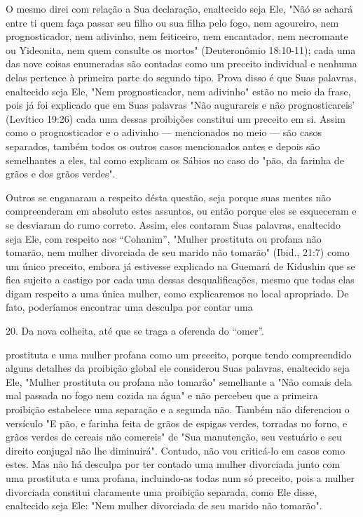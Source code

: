 O mesmo direi com relação a Sua declaração, enaltecido seja Ele, "Nãó se
achará entre ti quem faça passar seu filho ou sua filha pelo fogo, nem
agoureiro, nem prognosticador, nem adivinho, nem feiticeiro, nem
encanta­dor, nem necromante ou Yideonita, nem quem consulte os mortos"
(Deutero­nômio 18:10-11); cada uma das nove coisas enumeradas são
contadas como um preceito individual e nenhuma delas pertence à primeira
parte do segundo ti­po. Prova disso é que Suas palavras, enaltecido seja
Ele, "Nem prognosticador, nem adivinho" estão no meio da frase, pois já
foi explicado que em Suas pala­vras "Não augurareis e não
prognosticareis' (Levítico 19:26) cada uma dessas proibições constitui
um preceito em si. Assim como o prognosticador e o adi­vinho ---
mencionados no meio --- são casos separados, também todos os ou­tros
casos mencionados antes e depois são semelhantes a eles, tal como
expli­cam os Sábios no caso do "pão, da farinha de grãos e dos grãos
verdes".

Outros se enganaram a respeito désta questão, seja porque suas men­tes
não compreenderam em absoluto estes assuntos, ou então porque eles se
esqueceram e se desviaram do rumo correto. Assim, eles contaram Suas
pala­vras, enaltecido seja Ele, com respeito aos ``Cohanim'', "Mulher
prostituta ou profana não tomarão, nem mulher divorciada de seu marido
não tomarão" (Ibid., 21:7) como um único preceito, embora já estivesse
explicado na Guemará de Kidushin que se fica sujeito a castigo por cada
uma dessas desqualificações, mes­mo que todas elas digam respeito a uma
única mulher, como explicaremos no local apropriado. De fato, poderíamos
encontrar uma desculpa por contar uma

20. Da nova colheita, até que se traga a oferenda do ``omer''.

prostituta e uma mulher profana como um preceito, porque tendo
compreen­dido alguns detalhes da proibição global ele considerou Suas
palavras, enalteci­do seja Ele, "Mulher prostituta ou profana não
tomarão" semelhante a "Não comais dela mal passada no fogo nem cozida na
água" e não percebeu que a primeira proibição estabelece uma separação e
a segunda não. Também não di­ferenciou o versículo "E pão, e farinha
feita de grãos de espigas verdes, torra­das no forno, e grãos verdes de
cereais não comereis" de "Sua manutenção, seu vestuário e seu direito
conjugal não lhe diminuirá". Contudo, não vou cri­ticá-lo em casos como
estes. Mas não há desculpa por ter contado uma mulher divorciada junto
com uma prostituta e uma profana, incluindo-as todas num só preceito,
pois a mulher divorciada constitui claramente uma proibição sepa­rada,
como Ele disse, enaltecido seja Ele: "Nem mulher divorciada de seu
mari­do não tomarão".

